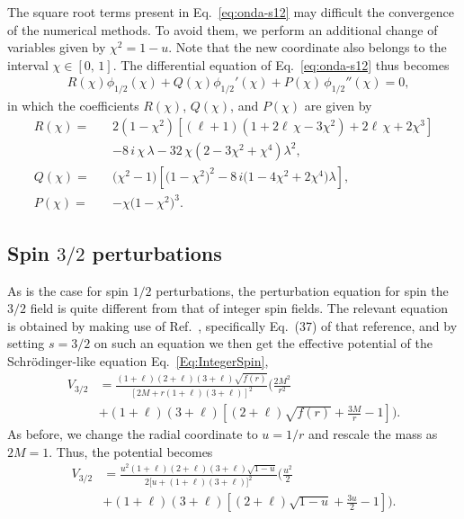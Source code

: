 The square root terms present in Eq.~\eqref{eq:onda-s12} may difficult the convergence of the numerical methods. To avoid them, we perform an additional change of variables given by $\chi^2=1-u$. Note that the new coordinate also belongs to the interval $\chi \in [0,\,1]$. The differential equation of Eq.~\eqref{eq:onda-s12} thus becomes
%
\begin{equation}\label{eq:onda-s12a}
  \begin{split}
    &R(\chi)\phi_{\scriptscriptstyle{1/2}}(\chi) + Q(\chi)\phi_{\scriptscriptstyle{1/2}}'(\chi) + P(\chi) \,\phi_{\scriptscriptstyle{1/2}}''(\chi)=0,
  \end{split}
\end{equation}
%
in which the coefficients $R(\chi)$, $Q(\chi)$, and $P(\chi)$ are given by
%
\begin{eqnarray}
  R(\chi)=
  \,&&2(1-\chi^2)\left[\left(\ell+1\right) \left(1+ 2\ell\,\chi-3\chi^2\right) + 2\ell\, \chi +2\chi^3\right] \nonumber \\
  && - 8\,i\,\chi \,\lambda-32\,\chi\left(2-3\chi^2+\chi^4\right)\lambda^2,\\
  Q(\chi) = && (\chi^2-1\big)\left[\big(1-\chi^2\big)^2-8\,i\big(1-4\chi^2+2\chi^4\big)\lambda\right],\\
  P(\chi)  =&& -\chi\big(1-\chi^2\big)^3.
\end{eqnarray}

\subsection{Spin $3/2$ perturbations}

As is the case for spin $1/2$ perturbations, the perturbation equation for spin the $3/2$ field is quite different from that of integer spin fields. The relevant equation is obtained by making use of Ref.~\cite{Shu:2005fw}, specifically Eq.~(37) of that reference, and by setting $s=3/2$ on such an equation we then get the effective potential of the Schr\"odinger-like equation Eq.~\eqref{Eq:IntegerSpin},
%
\begin{equation} \begin{split}
    V_{\scriptscriptstyle{3/2}} &=\frac{(1+\ell)(2+\ell)(3+\ell)\sqrt{f(r)}}{\left[2M+r(1+\ell)(3+\ell)\right]^2} \bigg(\frac{2M^2}{r^2}\\ &+(1+\ell)(3+\ell)\left[(2+\ell)\sqrt{f(r)}+\frac{3M}{r}-1\right]\bigg).
  \end{split}
\end{equation}
%
As before, we change the radial coordinate to $u=1/r$ and rescale the mass as $2M=1$. Thus, the potential becomes
%
\begin{equation}\begin{split}
    V_{\scriptscriptstyle{3/2}}&=\frac{u^2(1+\ell)(2+\ell)(3+\ell)\sqrt{1-u}}{2\big[u+(1+\ell)(3+\ell)\big]^2} \bigg(\frac{u^2}{2}\\ &+(1+\ell)(3+\ell)\left[(2+\ell)\sqrt{1-u}+\frac{3u}{2}-1\right]\bigg).
  \end{split}
\end{equation}


